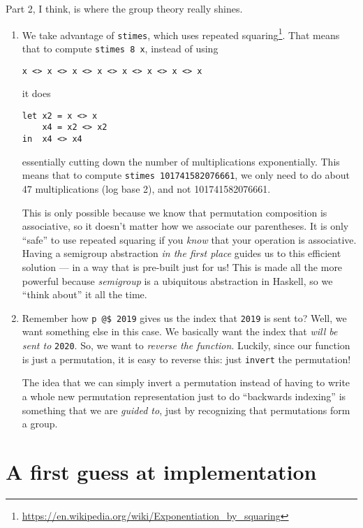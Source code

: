 \documentclass[]{article}
\renewcommand{\href}[2]{#2\footnote{\url{#1}}}
\begin{document}
Part 2, I think, is where the group theory really shines.

\begin{enumerate}
\def\labelenumi{\arabic{enumi}.}
\item
  We take advantage of \texttt{stimes}, which uses
  \href{https://en.wikipedia.org/wiki/Exponentiation_by_squaring}{repeated
  squaring}. That means that to compute \texttt{stimes\ 8\ x}, instead of using

\begin{verbatim}
x <> x <> x <> x <> x <> x <> x <> x
\end{verbatim}

  it does

\begin{verbatim}
let x2 = x <> x
    x4 = x2 <> x2
in  x4 <> x4
\end{verbatim}

  essentially cutting down the number of multiplications exponentially. This
  means that to compute \texttt{stimes\ 101741582076661}, we only need to do
  about 47 multiplications (log base 2), and not 101741582076661.

  This is only possible because we know that permutation composition is
  associative, so it doesn't matter how we associate our parentheses. It is only
  ``safe'' to use repeated squaring if you \emph{know} that your operation is
  associative. Having a semigroup abstraction \emph{in the first place} guides
  us to this efficient solution --- in a way that is pre-built just for us! This
  is made all the more powerful because \emph{semigroup} is a ubiquitous
  abstraction in Haskell, so we ``think about'' it all the time.
\item
  Remember how \texttt{p\ @\$\ 2019} gives us the index that \texttt{2019} is
  sent to? Well, we want something else in this case. We basically want the
  index that \emph{will be sent to} \texttt{2020}. So, we want to \emph{reverse
  the function}. Luckily, since our function is just a permutation, it is easy
  to reverse this: just \texttt{invert} the permutation!

  The idea that we can simply invert a permutation instead of having to write a
  whole new permutation representation just to do ``backwards indexing'' is
  something that we are \emph{guided to}, just by recognizing that permutations
  form a group.
\end{enumerate}

\hypertarget{a-first-guess-at-implementation}{%
\section{A first guess at
implementation}\label{a-first-guess-at-implementation}}
\end{document}

